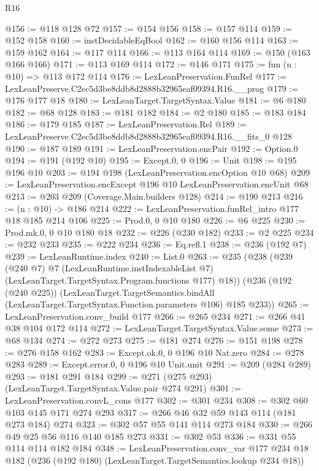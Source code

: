\begin{lexlean}{R16}
\begin{coremodule}
@156 := @118 @128 @72
@157 := @154 @156
@158 := @157 @114
@159 := @152 @158
@160 := instDecidableEqBool
@162 := @160 @156 @114
@163 := @159 @162
@164 := @117 @114
@166 := @113 @164 @114
@169 := @150 (@163 @166 @166)
@171 := @113 @169 @114
@172 := @146 @171
@175 := fun (n : @10) => @113 @172 @114
@176 := LexLeanPreservation.FunRel
@177 := LexLeanPreserve.C2ec5d3be8ddb8d2888b32965eaf09394.R16.__prog
@179 := @176 @177 @18
@180 := LexLeanTarget.TargetSyntax.Value
@181 := @6 @180
@182 := @68 @128
@183 := @181 @182
@184 := @2 @180
@185 := @183 @184
@186 := @179 @185
@187 := LexLeanPreservation.Rel
@189 := LexLeanPreserve.C2ec5d3be8ddb8d2888b32965eaf09394.R16.__fits_0 @128
@190 := @187 @189
@191 := LexLeanPreservation.encPair
@192 := Option.{0}
@194 := @191 (@192 @10)
@195 := Except.{0, 0}
@196 := Unit
@198 := @195 @196 @10
@203 := @194 @198 (LexLeanPreservation.encOption @10 @68)
@209 := LexLeanPreservation.encExcept @196 @10 LexLeanPreservation.encUnit @68
@213 := @203 @209 (Coverage.Main.builders @128)
@214 := @190 @213
@216 := (n : @10) -> @186 @214
@222 := LexLeanPreservation.funRel_intro @177 @18 @185 @214 @106
@225 := Prod.{0, 0} @10 @180
@226 := @6 @225
@230 := Prod.mk.{0, 0} @10 @180 @18
@232 := @226 (@230 @182)
@233 := @2 @225
@234 := @232 @233
@235 := @222 @234
@236 := Eq.refl.{1}
@238 := @236 (@192 @7)
@239 := LexLeanRuntime.index
@240 := List.{0}
@263 := @235
    (@238
      (@239
        (@240 @7)
        @7
        (LexLeanRuntime.instIndexableList @7)
        (LexLeanTarget.TargetSyntax.Program.functions @177)
        @18))
    (@236
      (@192 (@240 @225))
      (LexLeanTarget.TargetSemantics.bindAll
        (LexLeanTarget.TargetSyntax.Function.parameters @106)
        @185
        @233))
@265 := LexLeanPreservation.conv_build @177
@266 := @265 @234
@271 := @266 @41 @38 @104 @172 @114
@272 := LexLeanTarget.TargetSyntax.Value.some
@273 := @68 @134
@274 := @272 @273
@275 := @181 @274
@276 := @151 @198
@278 := @276 @158 @162
@283 := Except.ok.{0, 0} @196 @10 Nat.zero
@284 := @278 @283
@289 := Except.error.{0, 0} @196 @10 Unit.unit
@291 := @209 (@284 @289)
@293 := @181 @291 @184
@299 := @271 (@275 @293) (LexLeanTarget.TargetSyntax.Value.pair @274 @291)
@301 := LexLeanPreservation.convL_cons @177
@302 := @301 @234
@308 := @302 @60 @103 @145 @171 @274 @293
@317 := @266 @46 @32 @59 @143 @114 (@181 @273 @184) @274
@323 := @302 @57 @55 @141 @114 @273 @184
@330 := @266 @49 @25 @56 @116 @140 @185 @273
@331 := @302 @53
@336 := @331 @55 @114 @114 @182 @184
@348 := LexLeanPreservation.conv_var
    @177
    @234
    @18
    @182
    (@236 (@192 @180) (LexLeanTarget.TargetSemantics.lookup @234 @18))

\end{coremodule}
\end{lexlean}
